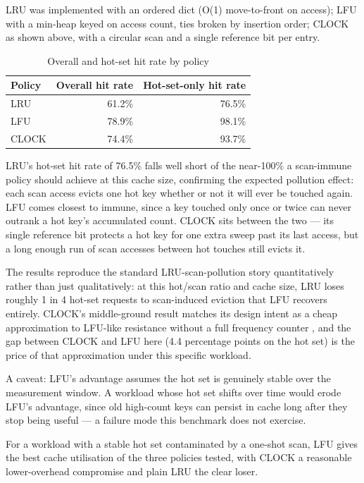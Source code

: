 \documentclass[lstlisting]{hebdomon}
\begin{document}
LRU was implemented with an ordered dict (O(1) move-to-front on
access); LFU with a min-heap keyed on access count, ties broken by
insertion order; CLOCK as shown above, with a circular scan and a
single reference bit per entry.


\begin{table}[h]
\centering
\caption{Overall and hot-set hit rate by policy}
\begin{tabular}{lrr}
\toprule
Policy & Overall hit rate & Hot-set-only hit rate \\
\midrule
LRU    & 61.2\% & 76.5\% \\
LFU    & 78.9\% & 98.1\% \\
CLOCK  & 74.4\% & 93.7\% \\
\bottomrule
\end{tabular}
\end{table}

LRU's hot-set hit rate of 76.5\% falls well short of the near-100\%
a scan-immune policy should achieve at this cache size, confirming
the expected pollution effect: each scan access evicts one hot key
whether or not it will ever be touched again. LFU comes closest to
immune, since a key touched only once or twice can never outrank a
hot key's accumulated count. CLOCK sits between the two --- its
single reference bit protects a hot key for one extra sweep past its
last access, but a long enough run of scan accesses between hot
touches still evicts it.


The results reproduce the standard LRU-scan-pollution story
quantitatively rather than just qualitatively: at this hot/scan
ratio and cache size, LRU loses roughly 1 in 4 hot-set requests to
scan-induced eviction that LFU recovers entirely. CLOCK's
middle-ground result matches its design intent as a cheap
approximation to LFU-like resistance without a full frequency
counter \parencite{orourke1990}, and the gap between CLOCK and LFU
here (4.4 percentage points on the hot set) is the price of that
approximation under this specific workload.

A caveat: LFU's advantage assumes the hot set is genuinely stable
over the measurement window. A workload whose hot set shifts over
time would erode LFU's advantage, since old high-count keys can
persist in cache long after they stop being useful --- a failure
mode this benchmark does not exercise.


For a workload with a stable hot set contaminated by a one-shot
scan, LFU gives the best cache utilisation of the three policies
tested, with CLOCK a reasonable lower-overhead compromise and plain
LRU the clear loser.

\printbibliography
\end{document}
